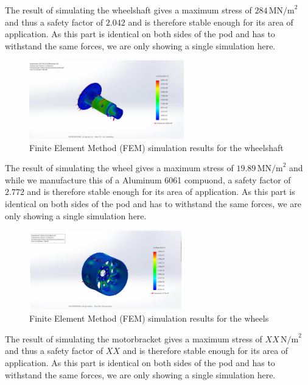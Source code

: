 The result of simulating the wheelshaft gives a maximum stress of \(284 \, \text{MN/m}^2\) and thus a safety factor of \(2.042\) and is therefore stable enough for its area of application. As this part is identical on both sides of the pod and has to withstand the same forces, we are only showing a single simulation here.

\begin{figure}[ht]
\centering
\includegraphics[width=0.6\textwidth]{texfiles/mech/eimg/propulsion/picture_simulation_wheelshaft}
\caption{Finite Element Method (FEM) simulation results for the wheelshaft}
\label{fig:wheelshaft_simulation}
\end{figure}

The result of simulating the wheel gives a maximum stress of \(19.89 \, \text{MN/m}^2\) and while we manufacture this of a Aluminum 6061 compuond, a safety factor of \(2.772\) and is therefore stable enough for its area of application. As this part is identical on both sides of the pod and has to withstand the same forces, we are only showing a single simulation here.

\begin{figure}[H]
\centering
\includegraphics[width=0.6\textwidth]{texfiles/mech/eimg/propulsion/picture_simulation_wheel}
\caption{Finite Element Method (FEM) simulation results for the wheels}
\label{fig:wheel_simulation}
\end{figure}

The result of simulating the motorbracket gives a maximum stress of \(XX \, \text{N/m}^2\) and thus a safety factor of \(XX\) and is therefore stable enough for its area of application. As this part is identical on both sides of the pod and has to withstand the same forces, we are only showing a single simulation here.

